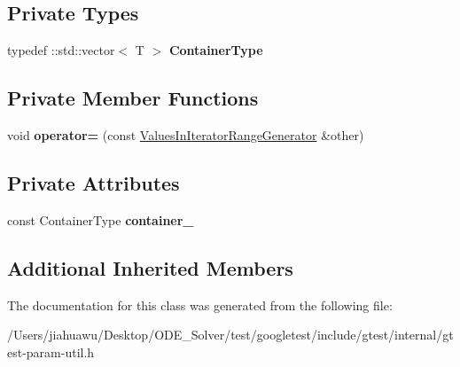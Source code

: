 \subsection*{Private Types}
\begin{DoxyCompactItemize}
\item 
\mbox{\label{classtesting_1_1internal_1_1_values_in_iterator_range_generator_afab6b799a125b471a8784ced9cf7335c}} 
typedef \+::std\+::vector$<$ T $>$ {\bfseries Container\+Type}
\end{DoxyCompactItemize}
\subsection*{Private Member Functions}
\begin{DoxyCompactItemize}
\item 
\mbox{\label{classtesting_1_1internal_1_1_values_in_iterator_range_generator_ab43e1feff118f5be232ae1b85d539dd1}} 
void {\bfseries operator=} (const \mbox{\hyperlink{classtesting_1_1internal_1_1_values_in_iterator_range_generator}{Values\+In\+Iterator\+Range\+Generator}} \&other)
\end{DoxyCompactItemize}
\subsection*{Private Attributes}
\begin{DoxyCompactItemize}
\item 
\mbox{\label{classtesting_1_1internal_1_1_values_in_iterator_range_generator_ad2701e9149384e64b1b98da5d31eb7a4}} 
const Container\+Type {\bfseries container\+\_\+}
\end{DoxyCompactItemize}
\subsection*{Additional Inherited Members}


The documentation for this class was generated from the following file\+:\begin{DoxyCompactItemize}
\item 
/\+Users/jiahuawu/\+Desktop/\+O\+D\+E\+\_\+\+Solver/test/googletest/include/gtest/internal/gtest-\/param-\/util.\+h\end{DoxyCompactItemize}
